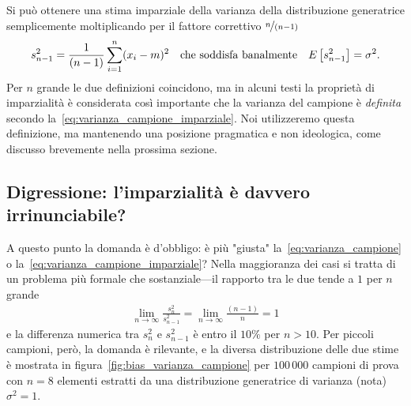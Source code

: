 Si può ottenere una stima imparziale della varianza della distribuzione
generatrice semplicemente moltiplicando per il fattore correttivo
$\nicefrac{n}{(n - 1)}$
\begin{align}\label{eq:varianza_campione_imparziale}
  s^2_{n - 1} = \frac{1}{(n - 1)}\sum_{i = 1}^n (x_i - m)^2
  \quad \text{che soddisfa banalmente} \quad
  \displaystyle E\left[s^2_{n - 1}\right] = \sigma^2.
\end{align}
Per $n$ grande le due definizioni coincidono, ma in alcuni testi la proprietà
di imparzialità è considerata così importante che la varianza del campione
è \emph{definita} secondo la~\eqref{eq:varianza_campione_imparziale}. Noi
utilizzeremo questa definizione, ma mantenendo una posizione pragmatica e non
ideologica, come discusso brevemente nella prossima sezione.


\subsection{Digressione: l'imparzialità è davvero irrinunciabile?}
\label{sec:imparzialita_var_campione}

\danger%
A questo punto la domanda è d'obbligo: è più "giusta"
la~\eqref{eq:varianza_campione} o la~\eqref{eq:varianza_campione_imparziale}?
Nella maggioranza dei casi si tratta di un problema più formale che
sostanziale---il rapporto tra le due tende a $1$ per $n$ grande
\begin{align*}
  \lim_{n \rightarrow \infty} \frac{s_n^2}{s_{n-1}^2} =
  \lim_{n \rightarrow \infty} \frac{(n - 1)}{n} = 1
\end{align*}
e la differenza numerica tra $s_n^2$ e $s_{n-1}^2$ è entro il $10\%$ per
$n > 10$. Per piccoli campioni, però, la domanda è rilevante, e la
diversa distribuzione delle due stime è mostrata in
figura~\ref{fig:bias_varianza_campione} per $100\,000$ campioni di prova con
$n = 8$ elementi estratti da una distribuzione generatrice di varianza (nota)
$\sigma^2 = 1$.


